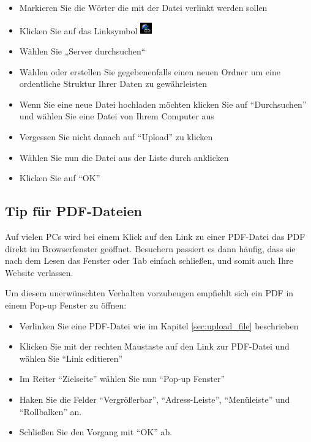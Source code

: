 \documentclass[article, a4paper, oneside, 11pt]{memoir}
\begin{document}
\begin{itemize}
\item Markieren Sie die Wörter die mit der Datei verlinkt werden sollen
\item Klicken Sie auf das Linksymbol \includegraphics[height=5mm]{link_icon}
\item Wählen Sie „Server durchsuchen“
\item Wählen oder erstellen Sie gegebenenfalls einen neuen Ordner um eine ordentliche Struktur Ihrer Daten zu gewährleisten
\item Wenn Sie eine neue Datei hochladen möchten klicken Sie auf "`Durchsuchen"' und wählen Sie eine Datei von Ihrem Computer aus
\item Vergessen Sie nicht danach auf "`Upload"' zu klicken
\item Wählen Sie nun die Datei aus der Liste durch anklicken
\item Klicken Sie auf "`OK"'
\end{itemize}


\subsection{Tip für PDF-Dateien}

Auf vielen PCs wird bei einem Klick auf den Link zu einer PDF-Datei das PDF direkt im Browserfenster geöffnet. Besuchern passiert es dann häufig, dass sie nach dem Lesen das Fenster oder Tab einfach schließen, und somit auch Ihre Website verlassen.

Um diesem unerwünschten Verhalten vorzubeugen empfiehlt sich ein PDF in einem Pop-up Fenster zu öffnen:

\begin{itemize}
\item Verlinken Sie eine PDF-Datei wie im Kapitel \vref{sec:upload_file} beschrieben
\item Klicken Sie mit der rechten Maustaste auf den Link zur PDF-Datei und wählen Sie "`Link editieren"'
\item Im Reiter "`Zielseite"' wählen Sie nun "`Pop-up Fenster"'
\item Haken Sie die Felder "`Vergrößerbar"', "`Adress-Leiste"', "`Menüleiste"' und "`Rollbalken"' an.
\item Schließen Sie den Vorgang mit "`OK"' ab.
\end{itemize}
\end{document}
